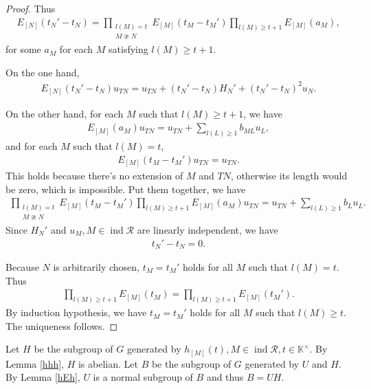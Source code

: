 \documentclass[12pt]{amsart}
\begin{document}
\begin{proof}
    Thus
    \begin{align*}
        E_{[N]}(t_N' - t_N) =  \prod_{\substack{l(M) = t \\ M\ncong N}} E_{[M]}(t_M - t_M') \prod\limits_{l(M)\geq t+1} E_{[M]}(a_M),
    \end{align*}
    for some $a_M$ for each $M$ satisfying $l(M)\geq t+1$.

    On the one hand, 
    \begin{align*}
        E_{[N]}(t_N' - t_N)u_{TN} = u_{TN} + (t_N'-t_N) H_N' + (t_N'-t_N)^2u_N.
    \end{align*}

    On the other hand, for each $M$ such that $l(M)\geq t+1$, we have
    \begin{align*}
        E_{[M]}(a_M) u_{TN} = u_{TN} + \sum\limits_{l(L)\geq 1} b_{ML} u_L,
    \end{align*}
    and for each $M$ such that $l(M) = t$, 
    \begin{align*}
        E_{[M]}(t_M-t_M') u_{TN} = u_{TN}.
    \end{align*}
    This holds because there's no extension of $M$ and $TN$, otherwise its length would be zero, which is impossible.
    Put them together, we have
    \begin{align*}
        \prod_{\substack{l(M) = t \\ M\ncong N}} E_{[M]}(t_M - t_M') \prod\limits_{l(M)\geq t+1} E_{[M]}(a_M) u_{TN} = u_{TN} + \sum\limits_{l(L)\geq 1}b_L u_L.
    \end{align*}
    Since $H_N'$ and $u_M, M \in \operatorname{ind}\mathcal{R}$ are linearly independent, we have
    \begin{align*}
        t_N'-t_N = 0.
    \end{align*}

    Because $N$ is arbitrarily chosen, $t_M=t_M'$ holds for all $M$ such that $l(M)=t$. Thus
    \begin{align*}
        \prod\limits_{l(M)\geq t+1} E_{[M]}(t_M) =  \prod\limits_{l(M)\geq t+1} E_{[M]}(t_M')  .
    \end{align*}
    By induction hypothesis, we have $t_M=t_M'$ holds for all $M$ such that $l(M)\geq t$.
    The uniqueness follows.
\end{proof}

Let $H$ be the subgroup of $G$ generated by $h_{[M]}(t), M \in \operatorname{ind}\mathcal{R}, t \in \mathbb{K}^{\times}$.
By Lemma \ref{hhh}, $H$ is abelian.
Let $B$ be the subgroup of $G$ generated by $U$ and $H$.
By Lemma \ref{hEh}, $U$ is a normal subgroup of $B$ and thus $B=UH$.
\end{document}

